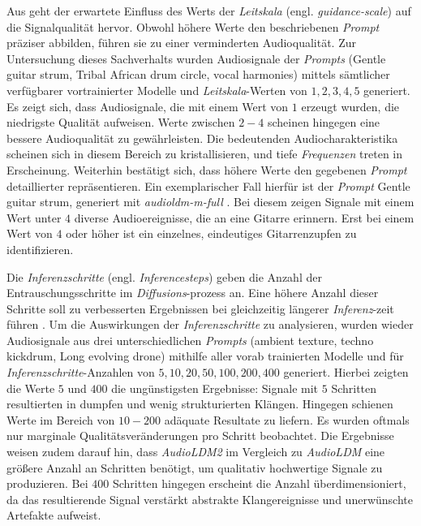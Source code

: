 \documentclass[
  a4paper,  %
  twoside,  %
  bibliography=totoc,
  headsepline,
  cleardoublepage=empty,
  parskip=half,
  draft=false
]{scrbook}
\begin{document}
Aus \cite{noauthor_huggingface-audioldm_nodate, noauthor_huggingface-audioldm2_nodate} geht der erwartete Einfluss des Werts der \emph{Leitskala} (engl. \emph{guidance-scale}) auf die Signalqualität hervor. Obwohl höhere Werte den beschriebenen \emph{Prompt} präziser abbilden, führen sie zu einer verminderten Audioqualität. Zur Untersuchung dieses Sachverhalts wurden Audiosignale der \emph{Prompts} (\glqq Gentle guitar strum, Tribal African drum circle, vocal harmonies\grqq) mittels sämtlicher verfügbarer vortrainierter Modelle und \emph{Leitskala}-Werten von $1,2,3,4,5$ generiert. Es zeigt sich, dass Audiosignale, die mit einem Wert von $1$ erzeugt wurden, die niedrigste Qualität aufweisen. Werte zwischen $2-4$ scheinen hingegen eine bessere Audioqualität zu gewährleisten. Die bedeutenden Audiocharakteristika scheinen sich in diesem Bereich zu kristallisieren, und tiefe \emph{Frequenzen} treten in Erscheinung. Weiterhin bestätigt sich, dass höhere Werte den gegebenen \emph{Prompt} detaillierter repräsentieren. Ein exemplarischer Fall hierfür ist der \emph{Prompt} \glqq Gentle guitar strum\grqq, generiert mit \emph{audioldm-m-full} \cite{noauthor_cvsspaudioldm-m-full_nodate}. Bei diesem zeigen Signale mit einem Wert unter $4$ diverse Audioereignisse, die an eine Gitarre erinnern. Erst bei einem Wert von $4$ oder höher ist ein einzelnes, eindeutiges Gitarrenzupfen zu identifizieren.

Die \emph{Inferenzschritte} (engl. \emph{Inferencesteps}) geben die Anzahl der Entrauschungsschritte im \emph{Diffusions}-prozess an. Eine höhere Anzahl dieser Schritte soll zu verbesserten Ergebnissen bei gleichzeitig längerer \emph{Inferenz}-zeit führen \cite{noauthor_huggingface-audioldm2_nodate, noauthor_huggingface-audioldm_nodate}. Um die Auswirkungen der \emph{Inferenzschritte} zu analysieren, wurden wieder Audiosignale aus drei unterschiedlichen \emph{Prompts} (\glqq ambient texture\grqq, \glqq techno kickdrum\grqq, \glqq Long evolving drone\grqq) mithilfe aller vorab trainierten Modelle und für \emph{Inferenzschritte}-Anzahlen von $5,10,20,50,100,200,400$ generiert. Hierbei zeigten die Werte $5$ und $400$ die ungünstigsten Ergebnisse: Signale mit $5$ Schritten resultierten in dumpfen und wenig strukturierten Klängen. Hingegen schienen Werte im Bereich von $10-200$ adäquate Resultate zu liefern. Es wurden oftmals nur marginale Qualitätsveränderungen pro Schritt beobachtet. Die Ergebnisse weisen zudem darauf hin, dass \emph{AudioLDM2} im Vergleich zu \emph{AudioLDM} eine größere Anzahl an Schritten benötigt, um qualitativ hochwertige Signale zu produzieren. Bei $400$ Schritten hingegen erscheint die Anzahl überdimensioniert, da das resultierende Signal verstärkt abstrakte Klangereignisse und unerwünschte Artefakte aufweist.
\end{document}
